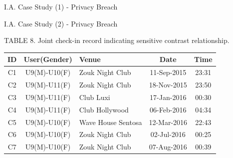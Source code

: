 \documentclass[
 size=14pt,
 paper=smartboard,  %
 mode=present, 		%
 display=slides, 	%
 style=tuliplab,  	%
 pauseslide,
 fleqn,leqno]{powerdot}
\begin{document}
\begin{slide}[toc=,bm=]{I.A. Case Study (1) - Privacy Breach}

\end{slide}



\begin{slide}[toc=,bm=]{I.A. Case Study (2) - Privacy Breach}

\begin{table}
	\setlength{\abovecaptionskip}{0pt}
	\setlength{\belowcaptionskip}{12pt}
	\centering
	TABLE 8. Joint check-in record indicating sensitive contrast relationship\protect\footnotemark[1].\\[15pt]
	\begin{tabular}{c|c|l|c|c}	
	\toprule	
	ID  				&  	\textbf{User(Gender)}		& 		\textbf{Venue} 		& 	\textbf{Date} 		&	\textbf{Time}	\\
	\midrule
	C{\footnotesize1}	&	U{\footnotesize9}(M)-U{\footnotesize10}(F)	&	Zouk Night Club		&	11-Sep-2015	&	23:31\\
	C{\footnotesize2}	&	U{\footnotesize9}(M)-U{\footnotesize11}(F)	&	Zouk Night Club		&	18-Nov-2015	&	23:50\\
	C{\footnotesize3}	&	U{\footnotesize9}(M)-U{\footnotesize11}(F)	&	Club Luxi				&	17-Jan-2016	&	00:30\\
	C{\footnotesize4}	&	U{\footnotesize9}(M)-U{\footnotesize11}(F)	&	Club Hollywood			&	06-Feb-2016	&	04:34\\
	C{\footnotesize5}	&	U{\footnotesize9}(M)-U{\footnotesize10}(F)	&	Wave House Sentosa	&	12-Mar-2016	&	22:43\\
	C{\footnotesize6}	&	U{\footnotesize9}(M)-U{\footnotesize10}(F)	&	Zouk Night Club		&	02-Jul-2016	&	00:25\\
	C{\footnotesize7}	&	U{\footnotesize9}(M)-U{\footnotesize10}(F)	&	Zouk Night Club		&	07-Aug-2016	&	00:39\\
	\bottomrule
	\end{tabular}
\end{table}



\end{slide}
\end{document}
